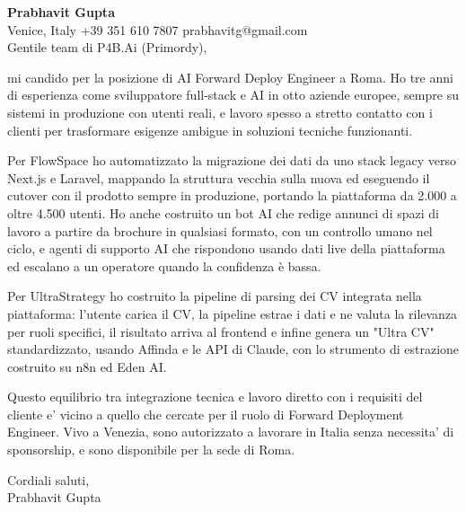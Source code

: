 \documentclass[a4paper,10.5pt]{article}
\begin{document}
\textbf{Prabhavit Gupta}\\
Venice, Italy \textbar{} +39 351 610 7807 \textbar{} prabhavitg@gmail.com\\[10pt]
Gentile team di P4B.Ai (Primordy),

mi candido per la posizione di AI Forward Deploy Engineer a Roma. Ho tre anni di esperienza come sviluppatore full-stack e AI in otto aziende europee, sempre su sistemi in produzione con utenti reali, e lavoro spesso a stretto contatto con i clienti per trasformare esigenze ambigue in soluzioni tecniche funzionanti.

Per FlowSpace ho automatizzato la migrazione dei dati da uno stack legacy verso Next.js e Laravel, mappando la struttura vecchia sulla nuova ed eseguendo il cutover con il prodotto sempre in produzione, portando la piattaforma da 2.000 a oltre 4.500 utenti. Ho anche costruito un bot AI che redige annunci di spazi di lavoro a partire da brochure in qualsiasi formato, con un controllo umano nel ciclo, e agenti di supporto AI che rispondono usando dati live della piattaforma ed escalano a un operatore quando la confidenza è bassa.

Per UltraStrategy ho costruito la pipeline di parsing dei CV integrata nella piattaforma: l'utente carica il CV, la pipeline estrae i dati e ne valuta la rilevanza per ruoli specifici, il risultato arriva al frontend e infine genera un "Ultra CV" standardizzato, usando Affinda e le API di Claude, con lo strumento di estrazione costruito su n8n ed Eden AI.

Questo equilibrio tra integrazione tecnica e lavoro diretto con i requisiti del cliente e' vicino a quello che cercate per il ruolo di Forward Deployment Engineer. Vivo a Venezia, sono autorizzato a lavorare in Italia senza necessita' di sponsorship, e sono disponibile per la sede di Roma.

Cordiali saluti,\\
Prabhavit Gupta
\end{document}
